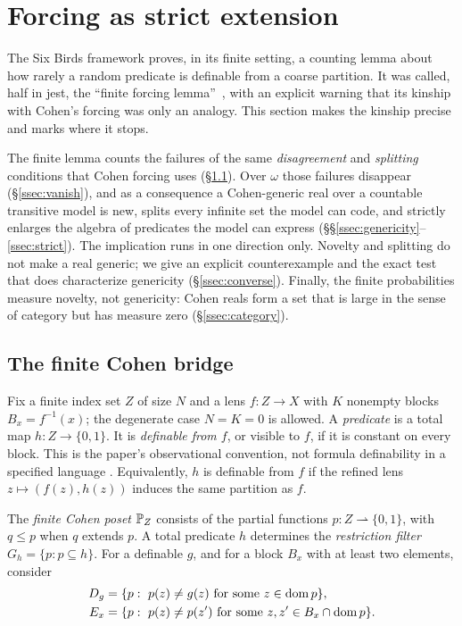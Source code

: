 \section{Forcing as strict extension}\label{sec:forcing}

The Six Birds framework proves, in its finite setting, a counting lemma about how rarely a random
predicate is definable from a coarse partition. It was called, half in jest, the ``finite forcing
lemma''~\citep{SBTFoundationsI}, with an explicit warning that its kinship with Cohen's forcing
\citep{Cohen1963,Cohen1966} was only an analogy. This section makes the kinship precise and marks
where it stops.

The finite lemma counts the failures of the same \emph{disagreement} and \emph{splitting}
conditions that Cohen forcing uses (\S\ref{ssec:finitebridge}). Over $\omega$ those failures
disappear (\S\ref{ssec:vanish}), and as a consequence a Cohen-generic real over a countable
transitive model is new, splits every infinite set the model can code, and strictly enlarges the
algebra of predicates the model can express (\S\S\ref{ssec:genericity}--\ref{ssec:strict}). The
implication runs in one direction only. Novelty and splitting do not make a real generic; we give
an explicit counterexample and the exact test that does characterize genericity
(\S\ref{ssec:converse}). Finally, the finite probabilities measure novelty, not genericity:
Cohen reals form a set that is large in the sense of category but has measure zero
(\S\ref{ssec:category}).

\subsection{The finite Cohen bridge}\label{ssec:finitebridge}

Fix a finite index set $Z$ of size $N$ and a lens $f\colon Z\to X$ with $K$ nonempty blocks
$B_x=f^{-1}(x)$; the degenerate case $N=K=0$ is allowed. A \emph{predicate} is a total map
$h\colon Z\to\{0,1\}$. It is \emph{definable from $f$}, or visible to $f$, if it is constant on
every block. This is the paper's observational convention, not formula definability in a
specified language \citep[for which see][]{Libkin2004}. Equivalently, $h$ is definable from $f$
if the refined lens $z\mapsto(f(z),h(z))$ induces the same partition as $f$.

The \emph{finite Cohen poset} $\mathbb{P}_Z$ consists of the partial functions $p\colon
Z\rightharpoonup\{0,1\}$, with $q\le p$ when $q$ extends $p$. A total predicate $h$ determines the
\emph{restriction filter} $G_h=\{p:p\subseteq h\}$. For a definable $g$, and for a block $B_x$ with
at least two elements, consider
\[
\begin{aligned}
  D_g&=\{p:\ p(z)\ne g(z)\text{ for some }z\in\operatorname{dom} p\},\\
  E_x&=\{p:\ p(z)\ne p(z')\text{ for some }z,z'\in B_x\cap\operatorname{dom} p\}.
\end{aligned}
\]

